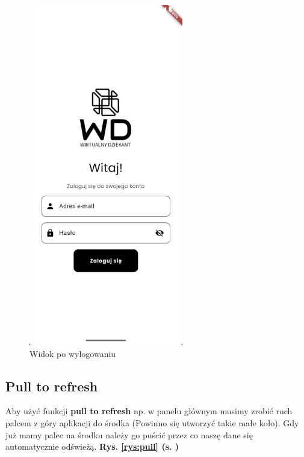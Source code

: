 \begin{figure}[h!]
	\centering
	\includegraphics[width=0.6\textwidth]{rys/ekranlogowania.png}
	\caption{Widok po wylogowaniu}
	\label{rys:wylogowanie}
\end{figure}
\newpage
\subsection{Pull to refresh}
Aby użyć funkcji \textbf{pull to refresh} np. w panelu głównym musimy zrobić ruch palcem z góry aplikacji do środka (Powinno się utworzyć takie małe koło). Gdy już mamy palec na środku należy go puścić przez co naszę dane się automatycznie odświeżą. \textbf{Rys. \ref{rys:pull} (s. \pageref{rys:pull})}

